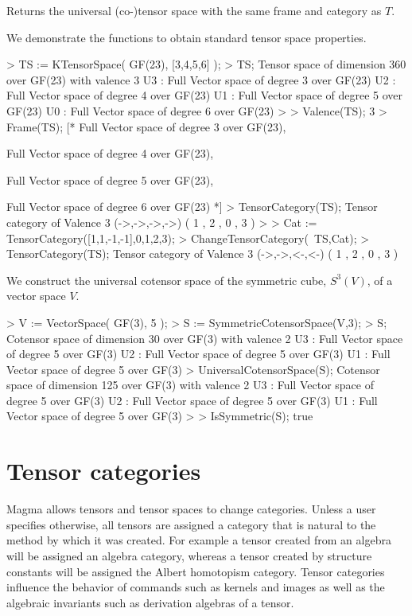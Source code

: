 Returns the universal (co-)tensor space with the same frame and category as $T$.

\begin{example}
We demonstrate the functions to obtain standard tensor space properties.

\begin{code}
> TS := KTensorSpace( GF(23), [3,4,5,6] );
> TS;
Tensor space of dimension 360 over GF(23) with valence 3
U3 : Full Vector space of degree 3 over GF(23)
U2 : Full Vector space of degree 4 over GF(23)
U1 : Full Vector space of degree 5 over GF(23)
U0 : Full Vector space of degree 6 over GF(23)
> 
> Valence(TS);
3
> Frame(TS);
[*
    Full Vector space of degree 3 over GF(23),

    Full Vector space of degree 4 over GF(23),

    Full Vector space of degree 5 over GF(23),

    Full Vector space of degree 6 over GF(23)
*]
> TensorCategory(TS);
Tensor category of Valence 3 (->,->,->,->) 
({ 1 },{ 2 },{ 0 },{ 3 })
> 
> Cat := TensorCategory([1,1,-1,-1],{{0},{1},{2},{3}});
> ChangeTensorCategory(~TS,Cat);
> TensorCategory(TS);
Tensor category of Valence 3 (->,->,<-,<-) 
({ 1 },{ 2 },{ 0 },{ 3 })
\end{code}

We construct the universal cotensor space of the symmetric cube, $S^3(V)$, of a vector space $V$.

\begin{code}
> V := VectorSpace( GF(3), 5 );
> S := SymmetricCotensorSpace(V,3);
> S;
Cotensor space of dimension 30 over GF(3) with valence 2
U3 : Full Vector space of degree 5 over GF(3)
U2 : Full Vector space of degree 5 over GF(3)
U1 : Full Vector space of degree 5 over GF(3)
> UniversalCotensorSpace(S);
Cotensor space of dimension 125 over GF(3) with valence 2
U3 : Full Vector space of degree 5 over GF(3)
U2 : Full Vector space of degree 5 over GF(3)
U1 : Full Vector space of degree 5 over GF(3)
> 
> IsSymmetric(S);
true
\end{code}
\end{example}

\chapter{Tensor categories}

Magma allows tensors and tensor spaces to change categories. 
Unless a user specifies otherwise,
all tensors are assigned a category that is natural to the method
by which it was created.
For example a tensor created from an algebra will be assigned an 
algebra category, whereas a tensor created by structure constants
will be assigned the Albert homotopism category.  Tensor categories influence
the behavior of commands such as kernels and images  
as well as the algebraic invariants such as derivation algebras of a tensor.  

